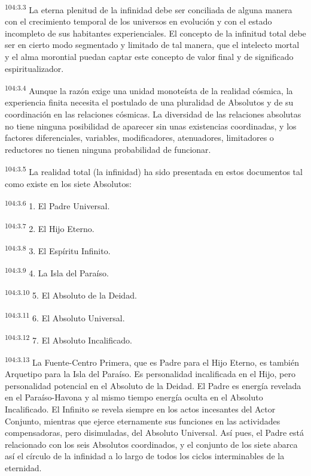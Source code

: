 \par
\textsuperscript{104:3.3} La eterna plenitud de la infinidad debe ser conciliada de alguna manera con el crecimiento temporal de los universos en evolución y con el estado incompleto de sus habitantes experienciales. El concepto de la infinitud total debe ser en cierto modo segmentado y limitado de tal manera, que el intelecto mortal y el alma morontial puedan captar este concepto de valor final y de significado espiritualizador.

\par
\textsuperscript{104:3.4} Aunque la razón exige una unidad monoteísta de la realidad cósmica, la experiencia finita necesita el postulado de una pluralidad de Absolutos y de su coordinación en las relaciones cósmicas. La diversidad de las relaciones absolutas no tiene ninguna posibilidad de aparecer sin unas existencias coordinadas, y los factores diferenciales, variables, modificadores, atenuadores, limitadores o reductores no tienen ninguna probabilidad de funcionar.

\par
\textsuperscript{104:3.5} La realidad total (la infinidad) ha sido presentada en estos documentos tal como existe en los siete Absolutos:

\par
\textsuperscript{104:3.6} 1. El Padre Universal.

\par
\textsuperscript{104:3.7} 2. El Hijo Eterno.

\par
\textsuperscript{104:3.8} 3. El Espíritu Infinito.

\par
\textsuperscript{104:3.9} 4. La Isla del Paraíso.

\par
\textsuperscript{104:3.10} 5. El Absoluto de la Deidad.

\par
\textsuperscript{104:3.11} 6. El Absoluto Universal.

\par
\textsuperscript{104:3.12} 7. El Absoluto Incalificado.

\par
\textsuperscript{104:3.13} La Fuente-Centro Primera, que es Padre para el Hijo Eterno, es también Arquetipo para la Isla del Paraíso. Es personalidad incalificada en el Hijo, pero personalidad potencial en el Absoluto de la Deidad. El Padre es energía revelada en el Paraíso-Havona y al mismo tiempo energía oculta en el Absoluto Incalificado. El Infinito se revela siempre en los actos incesantes del Actor Conjunto, mientras que ejerce eternamente sus funciones en las actividades compensadoras, pero disimuladas, del Absoluto Universal. Así pues, el Padre está relacionado con los seis Absolutos coordinados, y el conjunto de los siete abarca así el círculo de la infinidad a lo largo de todos los ciclos interminables de la eternidad.

